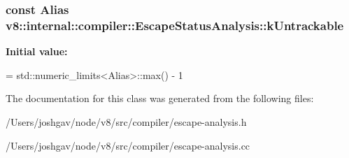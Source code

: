 \subsubsection[{\texorpdfstring{k\+Untrackable}{kUntrackable}}]{\setlength{\rightskip}{0pt plus 5cm}const Alias v8\+::internal\+::compiler\+::\+Escape\+Status\+Analysis\+::k\+Untrackable\hspace{0.3cm}{\ttfamily [static]}}\hypertarget{classv8_1_1internal_1_1compiler_1_1_escape_status_analysis_a9ba0d620dbcc79ac569498d79494b25c}{}\label{classv8_1_1internal_1_1compiler_1_1_escape_status_analysis_a9ba0d620dbcc79ac569498d79494b25c}
{\bfseries Initial value\+:}
\begin{DoxyCode}
=
    std::numeric\_limits<Alias>::max() - 1
\end{DoxyCode}


The documentation for this class was generated from the following files\+:\begin{DoxyCompactItemize}
\item 
/\+Users/joshgav/node/v8/src/compiler/escape-\/analysis.\+h\item 
/\+Users/joshgav/node/v8/src/compiler/escape-\/analysis.\+cc\end{DoxyCompactItemize}
